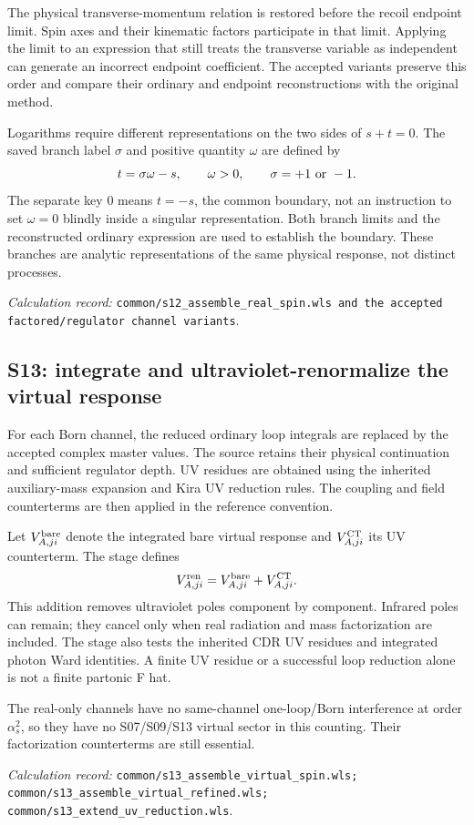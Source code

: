\documentclass[11pt,a4paper]{article}
\newcommand{\as}{\alpha_s}
\newcommand{\code}[1]{{\small\nolinkurl{#1}}}
\newcommand{\pathref}[1]{\par{\footnotesize\textit{Calculation record:} \code{#1}.}\par}
\begin{document}
The physical transverse-momentum relation is restored before the recoil endpoint limit. Spin axes and their kinematic factors participate in that limit. Applying the limit to an expression that still treats the transverse variable as independent can generate an incorrect endpoint coefficient. The accepted variants preserve this order and compare their ordinary and endpoint reconstructions with the original method.

Logarithms require different representations on the two sides of $s+t=0$. The saved branch label $\sigma$ and positive quantity $\omega$ are defined by
\begin{equation}
 t=\sigma\omega-s,\qquad \omega>0,\qquad\sigma=+1\ \hbox{or}\ -1.
\end{equation}
The separate key $0$ means $t=-s$, the common boundary, not an instruction to set $\omega=0$ blindly inside a singular representation. Both branch limits and the reconstructed ordinary expression are used to establish the boundary. These branches are analytic representations of the same physical response, not distinct processes.
\pathref{common/s12_assemble_real_spin.wls and the accepted factored/regulator channel variants}

\subsection{S13: integrate and ultraviolet-renormalize the virtual response}
For each Born channel, the reduced ordinary loop integrals are replaced by the accepted complex master values. The source retains their physical continuation and sufficient regulator depth. UV residues are obtained using the inherited auxiliary-mass expansion and Kira UV reduction rules. The coupling and field counterterms are then applied in the reference convention.

Let $V_{A,ji}^{\rm bare}$ denote the integrated bare virtual response and $V_{A,ji}^{\rm CT}$ its UV counterterm. The stage defines
\begin{equation}
 V_{A,ji}^{\rm ren}=V_{A,ji}^{\rm bare}+V_{A,ji}^{\rm CT}.
\end{equation}
This addition removes ultraviolet poles component by component. Infrared poles can remain; they cancel only when real radiation and mass factorization are included. The stage also tests the inherited CDR UV residues and integrated photon Ward identities. A finite UV residue or a successful loop reduction alone is not a finite partonic F hat.

The real-only channels have no same-channel one-loop/Born interference at order $\as^2$, so they have no S07/S09/S13 virtual sector in this counting. Their factorization counterterms are still essential.
\pathref{common/s13_assemble_virtual_spin.wls; common/s13_assemble_virtual_refined.wls; common/s13_extend_uv_reduction.wls}
\end{document}
